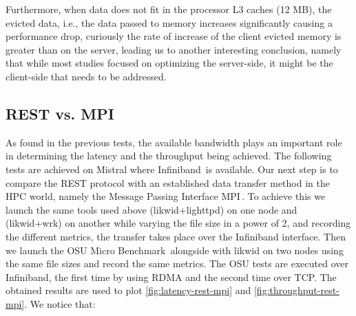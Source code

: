 \documentclass[runningheads]{llncs}
\begin{document}
Furthermore, when data does not fit in the processor L3 caches (12 MB), the evicted data, i.e., the data passed to memory increases significantly causing a performance drop, curiously the rate of increase of the client evicted memory is greater than on the server, leading us to another interesting conclusion, namely that while most studies focused on optimizing the server-side, it might be the client-side that needs to be addressed.

\subsection{REST vs. MPI}\label{subsec:tcpib}
As found in the previous tests, the available bandwidth plays an important role in determining the latency and the throughput being achieved. The following tests are achieved on Mistral where Infiniband\,\cite{Infiniband} is available.
Our next step is to compare the REST protocol with an established data transfer method in the HPC world, namely the Message Passing Interface MPI\,\cite{MPI}.
To achieve this we launch the same tools used above (likwid+lighttpd) on one node and (likwid+wrk) on another while varying the file size in a power of 2, and recording the different metrics, the transfer takes place over the Infiniband interface.
Then we launch the OSU Micro Benchmark\,\cite{osumicrobenchmark} alongside with likwid on two nodes using the same file sizes and record the same metrics. The OSU tests are executed over Infiniband, the first time by using RDMA and the second time over TCP.
The obtained results are used to plot \cref{fig:latency-rest-mpi} and \cref{fig:throughput-rest-mpi}. We notice that:
\end{document}

